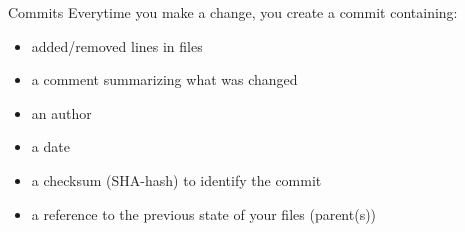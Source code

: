 \documentclass[18pt,mathserif]{beamer}
\begin{document}

\begin{frame}{Commits}
  Everytime you make a change, you create a \alert{commit} containing:
  \begin{itemize}
    \item added/removed lines in files
    \item a comment summarizing what was changed
    \item an author
    \item a date
    \item a checksum (SHA-hash) to identify the commit
    \item a reference to the previous state of your files (parent(s))
  \end{itemize}
\end{frame}



\end{document}
